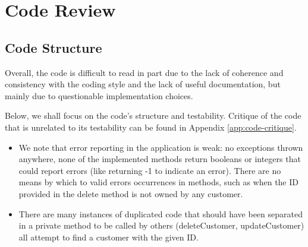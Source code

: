 \section{Code Review}


\subsection{Code Structure} 
\label{sec:code-structure}
Overall, the code is difficult to read in part due to the lack of coherence and consistency with the coding style and the lack of useful documentation, but mainly due to questionable implementation choices. 

Below, we shall focus on the code's structure and testability. Critique of the code that is unrelated to its testability can be found in Appendix \ref{app:code-critique}. 

\begin{itemize}
	\item We note that error reporting in the application is weak: no exceptions thrown anywhere, none of the implemented methods return booleans or integers that could report errors (like returning -1 to indicate an error). There are no means by which  to valid errors occurrences in methods, such as when the ID provided in the delete method is not owned by any customer. 
	\item There are many instances of duplicated code that should have been separated in a private method to be called by others (deleteCustomer, updateCustomer) all attempt to find a customer with the given ID. 
\end{itemize}


